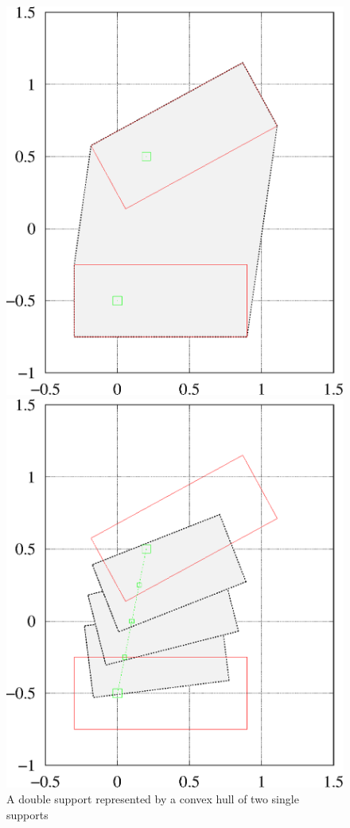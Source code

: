 \begin{figure}[ht]
\begin{minipage}[b]{0.4\linewidth}
    \centerline{%
    \includegraphics[scale=0.4]{Figures/ds_convex_hull.eps}}
    \caption[Double support]{A double support represented by a convex hull of two single supports}
    \label{fig.ds_hull}
\end{minipage}
\hfill
\begin{minipage}[b]{0.4\linewidth}
    \centerline{%
    \includegraphics[scale=0.4]{Figures/ds_approx.eps}}

\end{minipage}
\end{figure}
